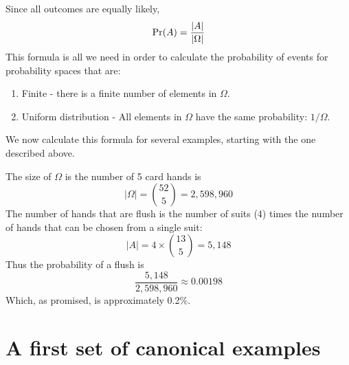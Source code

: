 Since all outcomes are equally likely, 
\[
\mbox{\rm Pr}(A) = \frac{|A|}{|\Omega|}
\]
This formula is all we need in order to calculate the probability of
events for probability spaces that are:
\begin{enumerate}
\item Finite - there is a finite number of elements in $\Omega$.
\item Uniform distribution - All elements in $\Omega$ have the same
  probability: $1/\Omega$.
\end{enumerate}

We now calculate this formula for several examples, starting with the
one described above.

The size of $\Omega$ is the number of 5 card hands is 
$$ |\Omega| = {52 \choose 5} = 2,598,960$$
The number of hands that are flush is the
number of suits (4) times the number of hands that can be chosen from
a single suit: 
$$|A|= 4\times {13 \choose 5} = 5,148$$ 
Thus the probability of a flush is
$$\frac{5,148}{2,598,960} \approx 0.00198$$
Which, as promised, is approximately 0.2\%.

\section{A first set of canonical examples}

